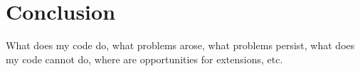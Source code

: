 \section{Conclusion}
What does my code do, what problems arose, what problems persist, what does my code cannot do, where are opportunities for extensions, etc.
\newpage